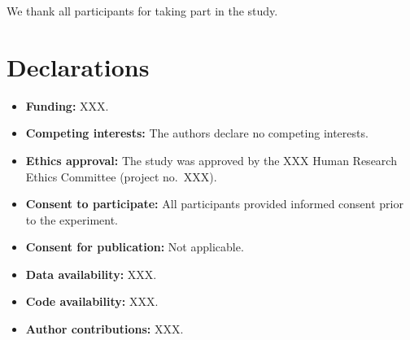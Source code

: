 \documentclass[pdflatex,sn-basic]{sn-jnl}
\begin{document}

\maketitle








\backmatter

We thank all participants for taking part in the study.

\section*{Declarations}

\begin{itemize}
\item \textbf{Funding:} XXX.
\item \textbf{Competing interests:} The authors declare no competing interests.
\item \textbf{Ethics approval:} The study was approved by the XXX Human Research Ethics Committee (project no.~XXX).
\item \textbf{Consent to participate:} All participants provided informed consent prior to the experiment.
\item \textbf{Consent for publication:} Not applicable.
\item \textbf{Data availability:} XXX.
\item \textbf{Code availability:} XXX.
\item \textbf{Author contributions:} XXX.
\end{itemize}

\end{document}
